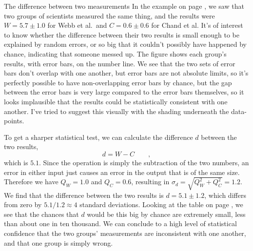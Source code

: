 \begin{eg}{The difference between two measurements}\label{eg:difference-between-measurements}
In the example on page \pageref{eg:fine-structure}, we saw that two groups of scientists measured the
same thing, and the results were $W=5.7\pm1.0$ for Webb et al.~and  $C=0.6\pm 0.6$ for Chand et al.
It's of interest to know whether the difference between their two results is small enough to be
explained by random errors, or so big that it couldn't possibly have happened by chance, indicating
that someone messed up. The figure shows each group's results, with error bars, on the number line.
We see that the two sets of error bars don't overlap with one another, but error bars are not absolute
limits, so it's perfectly possible to
have non-overlapping error bars by chance, but the gap between the error bars is very large compared
to the error bars themselves, so it looks implausible that the results could be statistically
consistent with one another. I've tried to suggest this visually with the shading underneath the
data-points.


To get a sharper statistical test, we can calculate the difference $d$ between the two results,
\begin{equation*}
  d = W-C \qquad ,
\end{equation*}
which is $5.1$. Since the operation is simply the subtraction of the two numbers, an error in
either input just causes an error in the output that is of the same size. Therefore we have
$Q_W=1.0$ and $Q_C=0.6$, resulting in $\sigma_d=\sqrt{Q_W^2+Q_C^2}=1.2$. We find that the difference
between the two results is $d=5.1\pm 1.2$, which differs from zero by $5.1/1.2\approx 4$ standard
deviations. Looking at the table on page \pageref{probability-of-deviations}, we see that the
chances that $d$ would be this big by chance are extremely small, less than about one in ten
thousand. We can conclude to a high level of statistical confidence that the two groups' measurements
are inconsistent with one another, and that one group is simply wrong.
\end{eg}
